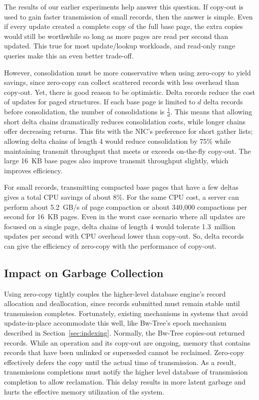 

The results of our earlier experiments help answer this question.  If copy-out
is used to gain faster transmission of small records, then the answer is
simple. Even if every update created a complete copy of the full base page, the
extra copies would still be worthwhile so long as more pages are read per
second than updated. This true for most update/lookup workloads, and read-only
range queries make this an even better trade-off.

However, consolidation must be more conservative when using zero-copy to yield
savings, since zero-copy can collect scattered records with less overhead than
copy-out. Yet, there is good reason to be optimistic.  Delta records
reduce the cost of updates for paged structures. If each base page is limited
to $d$ delta records before consolidation, the number of consolidations is
$\frac{1}{d}$. This means that allowing short delta chains dramatically reduces
consolidation costs, while longer chains offer decreasing returns. This fits with
the NIC's preference for short gather lists; allowing delta chains of length 4
would reduce consolidation by 75\% while maintaining transmit throughput that
meets or exceeds on-the-fly copy-out.  The large 16~KB base pages also
improve transmit throughput slightly, which improves efficiency.

For small records, transmitting compacted base pages that have a few deltas gives
a total CPU savings of about 8\%. For the same CPU cost, a server can perform
about 5.2~GB/s of page compaction or about 340,000 compactions per second for
16~KB pages. Even in the worst case scenario where all updates are focused on a
single page, delta chains of length 4 would tolerate 1.3~million updates per
second with CPU overhead lower than copy-out. So, delta records can give the
efficiency of zero-copy with the performance of copy-out.


\subsection{Impact on Garbage Collection}

Using zero-copy tightly couples the higher-level database engine's record
allocation and deallocation, since records submitted must remain stable until
transmission completes. Fortunately, existing mechanisms in systems that avoid
update-in-place accommodate this well, like Bw-Tree's epoch mechanism described
in Section~\ref{sec:indexing}. Normally, the Bw-Tree copies-out returned records.
While an operation and its copy-out are ongoing, memory that contains records
that have been unlinked or superseded cannot be reclaimed. Zero-copy
effectively defers the copy until the actual time of transmission. As a result,
transmissions completions must notify the higher level database of transmission
completion to allow reclamation. This delay results in more latent garbage and
hurts the effective memory utilization of the system.

